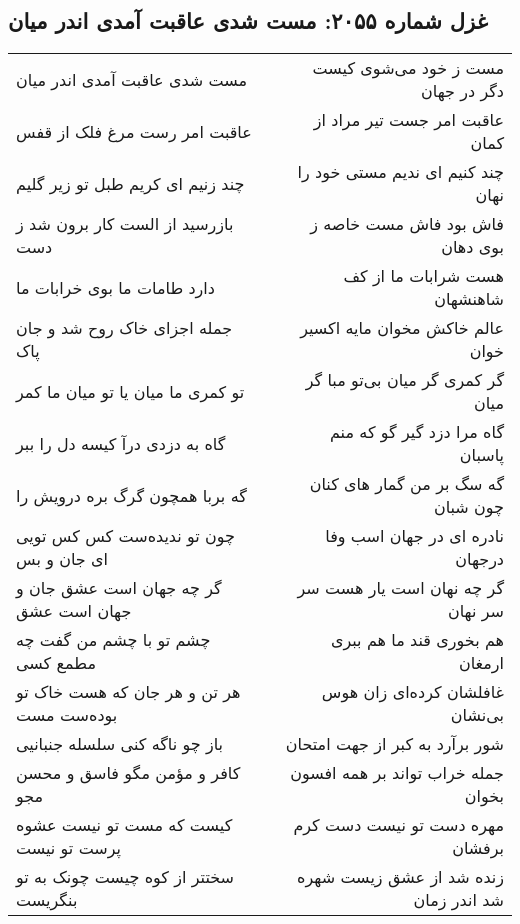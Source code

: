 \begin{center}
\section*{غزل شماره ۲۰۵۵: مست شدی عاقبت آمدی اندر میان}
\label{sec:2055}
\begin{longtable}{l p{0.5cm} r}
مست شدی عاقبت آمدی اندر میان
&&
مست ز خود می‌شوی کیست دگر در جهان
\\
عاقبت امر رست مرغ فلک از قفس
&&
عاقبت امر جست تیر مراد از کمان
\\
چند زنیم ای کریم طبل تو زیر گلیم
&&
چند کنیم ای ندیم مستی خود را نهان
\\
بازرسید از الست کار برون شد ز دست
&&
فاش بود فاش مست خاصه ز بوی دهان
\\
دارد طامات ما بوی خرابات ما
&&
هست شرابات ما از کف شاهنشهان
\\
جمله اجزای خاک روح شد و جان پاک
&&
عالم خاکش مخوان مایه اکسیر خوان
\\
تو کمری ما میان یا تو میان ما کمر
&&
گر کمری گر میان بی‌تو مبا گر میان
\\
گاه به دزدی درآ کیسه دل را ببر
&&
گاه مرا دزد گیر گو که منم پاسبان
\\
گه بربا همچون گرگ بره درویش را
&&
گه سگ بر من گمار های کنان چون شبان
\\
چون تو ندیده‌ست کس کس تویی ای جان و بس
&&
نادره ای در جهان اسب وفا درجهان
\\
گر چه جهان است عشق جان و جهان است عشق
&&
گر چه نهان است یار هست سر سر نهان
\\
چشم تو با چشم من گفت چه مطمع کسی
&&
هم بخوری قند ما هم ببری ارمغان
\\
هر تن و هر جان که هست خاک تو بوده‌ست مست
&&
غافلشان کرده‌ای زان هوس بی‌نشان
\\
باز چو ناگه کنی سلسله جنبانیی
&&
شور برآرد به کبر از جهت امتحان
\\
کافر و مؤمن مگو فاسق و محسن مجو
&&
جمله خراب تواند بر همه افسون بخوان
\\
کیست که مست تو نیست عشوه پرست تو نیست
&&
مهره دست تو نیست دست کرم برفشان
\\
سختتر از کوه چیست چونک به تو بنگریست
&&
زنده شد از عشق زیست شهره شد اندر زمان
\\
\end{longtable}
\end{center}
